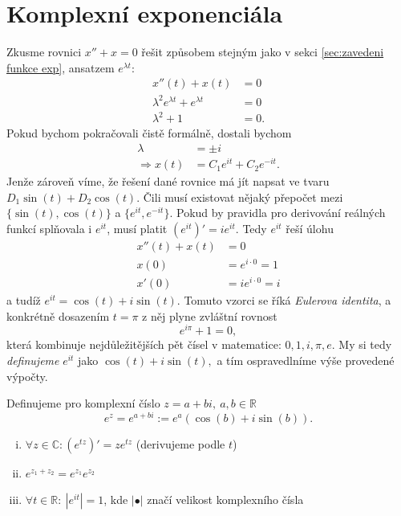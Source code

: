 \section{Komplexní exponenciála}
Zkusme rovnici $x''+x=0$ řešit způsobem stejným jako v sekci \ref{sec:zavedeni funkce exp}, ansatzem $e^{\lambda t}:$
\begin{align*}
	x''(t)+x(t)&=0 \\
	\lambda^{2}e^{\lambda t}+ e^{\lambda t}&=0 \\
	\lambda^{2}+1 &= 0.
\end{align*}
Pokud bychom pokračovali čistě formálně, dostali bychom
\begin{align*}
	\lambda &= \pm i \\
	\Rightarrow x(t) &= C_1e^{it}+C_2e^{-it}.
\end{align*}
Jenže zároveň víme, že řešení dané rovnice má jít napsat ve tvaru $D_1\sin(t)+D_2\cos(t).$ Čili musí existovat nějaký přepočet mezi $\{\sin(t),\cos(t)\}$ a $\{e^{it},e^{-it}\}.$ Pokud by pravidla pro derivování reálných funkcí splňovala i $e^{it}$, musí platit $(e^{it})'=ie^{it}.$ Tedy $e^{it}$ řeší úlohu
\begin{align*}
	x''(t)+x(t) &= 0 \\
	x(0) &= e^{i\cdot 0}=1 \\
	x'(0) &= ie^{i\cdot 0}=i
\end{align*}
a tudíž $e^{it}=\cos(t)+i\sin(t).$ Tomuto vzorci se říká \emph{Eulerova identita}, a konkrétně dosazením $t=\pi$ z něj plyne zvláštní rovnost
\begin{equation*}
	\boxed{e^{i\pi}+1=0,}
\end{equation*}
která kombinuje nejdůležitějších pět čísel v matematice: $0,1,i,\pi,e.$ My si tedy \emph{definujeme} $e^{it}$ jako $\cos(t)+i\sin(t),$ a tím ospravedlníme výše provedené výpočty.
\begin{definice}
  Definujeme pro komplexní číslo $z=a+bi,\ a,b\in \mathbb{R}$
  \begin{equation*}
    e^{z}=e^{a+bi}:=e^{a}(\cos(b)+i\sin(b)).
  \end{equation*}
\end{definice}
\begin{věta}\leavevmode
	\begin{enumerate}[(i)]
	\item $\forall z\in \mathbb{C}\colon (e^{tz})'=ze^{tz}$ (derivujeme podle $t$)
	\item $e^{z_1+z_2}=e^{z_1}e^{z_2}$
	\item $\forall t\in \mathbb{R}\colon\ |e^{it}|=1$, kde $|\bullet|$ značí velikost komplexního čísla
  \end{enumerate}
\end{věta}
